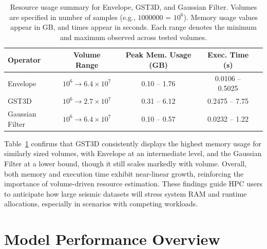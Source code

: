 \begin{table}[htbp]
    \centering
    \begin{tabular}{lcccc}
        \hline
        \textbf{Operator} & \textbf{Volume Range} & \textbf{Peak Mem. Usage (GB)} & \textbf{Exec. Time (s)} \\ \hline
        Envelope &
        $10^6 \!\to\! 6.4\times10^7$ &
        0.10 -- 1.76 &
        0.0106 -- 0.5025 \\
        \ac{GST3D} &
        $10^6 \!\to\! 2.7\times10^7$ &
        0.31 -- 6.12 &
        0.2475 -- 7.75 \\
        Gaussian Filter &
        $10^6 \!\to\! 6.4\times10^7$ &
        0.10 -- 0.57 &
        0.0232 -- 1.22 \\
        \hline
    \end{tabular}
    \caption{Resource usage summary for Envelope, \ac{GST3D}, and Gaussian Filter.
    Volumes are specified in number of samples (e.g., $1000000$ = $10^6$).
    Memory usage values appear in GB, and times appear in seconds.
    Each range denotes the minimum and maximum observed across tested volumes.}
    \label{tab:operator_summary_aggregates}
\end{table}

Table~\ref{tab:operator_summary_aggregates} confirms that \ac{GST3D} consistently displays the highest memory usage for similarly sized volumes, with Envelope at an intermediate level, and the Gaussian Filter at a lower bound, though it still scales markedly with volume.
Overall, both memory and execution time exhibit near-linear growth, reinforcing the importance of volume-driven resource estimation.
These findings guide \ac{HPC} users to anticipate how large seismic datasets will stress system \ac{RAM} and runtime allocations, especially in scenarios with competing workloads.


\section{Model Performance Overview}
\label{sec:pmc-results-model-performance-overview}

